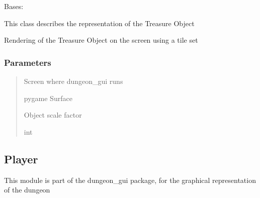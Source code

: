 \documentclass[letterpaper,10pt,english]{sphinxmanual}
\begin{document}
\begin{fulllineitems}
\label{\detokenize{api_reference/dungeon_gui/Loot:Loot.Loot}}
\pysigstartsignatures
{}
\pysigstopsignatures
\sphinxAtStartPar
Bases: 

\sphinxAtStartPar
This class describes the representation of the Treasure Object

\begin{fulllineitems}
\label{\detokenize{api_reference/dungeon_gui/Loot:Loot.Loot.render_collectable}}
\pysigstartsignatures
{}
\pysigstopsignatures
\sphinxAtStartPar
Rendering of the Treasure Object on the screen using a tile set


\subsubsection{Parameters}
\label{\detokenize{api_reference/dungeon_gui/Loot:parameters}}\begin{quote}\begin{description}
\sphinxAtStartPar
Screen where dungeon\_gui runs

\sphinxAtStartPar
pygame Surface

\sphinxAtStartPar
Object scale factor

\sphinxAtStartPar
int

\end{description}\end{quote}

\end{fulllineitems}


\end{fulllineitems}


\sphinxstepscope


\subsection{Player}
\label{\detokenize{api_reference/dungeon_gui/Player:module-Player}}\label{\detokenize{api_reference/dungeon_gui/Player:player}}\label{\detokenize{api_reference/dungeon_gui/Player::doc}}
\sphinxAtStartPar
This module is part of the dungeon\_gui package, for the graphical representation of the dungeon
\end{document}
